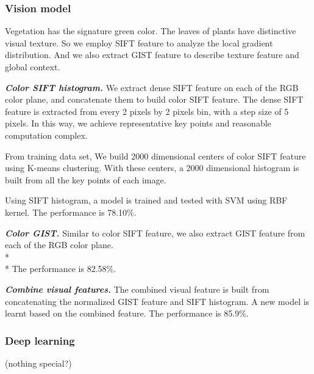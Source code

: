 \subsubsection*{Vision model}
Vegetation has the signature green color. The leaves of plants have distinctive visual texture. So we employ SIFT feature to analyze the local gradient distribution. And we also extract GIST feature to describe texture feature and global context. 





\textbf{\textit{Color SIFT histogram.}}
We extract dense SIFT feature on each of the RGB color plane, and concatenate them to build color SIFT feature. The dense SIFT feature is extracted from every 2 pixels by 2 pixels bin, with a step size of 5 pixels. In this way, we achieve representative key points and reasonable computation complex. 

From training data set, We build 2000 dimensional centers of color SIFT feature using K-means clustering. With these centers, a 2000 dimensional histogram is built from all the key points of each image.

Using SIFT histogram, a model is trained and tested with SVM using RBF kernel. 
The performance is 78.10\%.

\textbf{\textit{Color GIST.}}
Similar to color SIFT feature, we also extract GIST feature from each of the RGB color plane.\\*\\*
The performance is 82.58\%.

\textbf{\textit{Combine visual features.}}
The combined visual feature is built from concatenating the normalized GIST feature and SIFT histogram. A new model is learnt based on the combined feature.
The performance is 85.9\%.

\subsubsection*{Deep learning}
(nothing special?)



